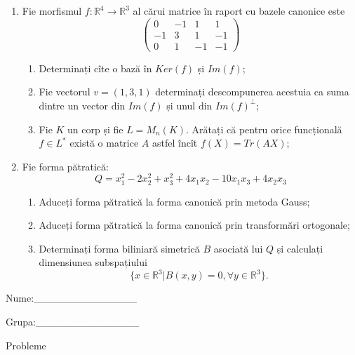 \documentclass{article}
\begin{document}
\begin{enumerate}
 \item Fie morfismul $f:\mathbb{R}^4 \to \mathbb{R}^3$ al cărui matrice în raport cu bazele canonice este
$$\begin{pmatrix}
0&-1&1&1\\
-1&3&1&-1\\
0&1&-1&-1
\end{pmatrix}$$

\begin{enumerate}
\item Determinați cîte o bază în $Ker(f)$ și $Im(f)$;
\item Fie vectorul $v=(1,3,1)$ determinați descompunerea acestuia ca suma dintre un vector din $Im(f)$ și unul din $Im(f)^\perp$;
\item Fie $K$ un corp și fie $L=M_n(K)$. Arătați că pentru orice funcțională $f \in L^*$ există o matrice $A$ astfel încît $f(X)=Tr(AX)$;
\end{enumerate}
\item Fie forma pătratică:
$$Q= x_1^2-2x_2^2+x_3^2+4x_1x_2-10x_1x_3+4x_2x_3$$

\begin{enumerate}
\item Aduceți forma pătratică la forma canonică prin metoda Gauss;
\item Aduceți forma pătratică la forma canonică prin transformări ortogonale;
\item Determinați forma biliniară simetrică $B$ asociată lui $Q$ și calculați dimensiunea subspațiului
$$\{x \in \mathbb{R}^3 | B(x,y)=0,\forall y \in \mathbb{R}^3\}.$$

\end{enumerate}
\end{enumerate}
\newpage
\begin{flushright}
Nume:\_\_\_\_\_\_\_\_\_\_\_\_\_\_
 
 
Grupa:\_\_\_\_\_\_\_\_\_\_\_\_\_\_
\end{flushright}
\begin{center}
\vspace{2cm}
{\Large Probleme}
\vspace{2cm}
\end{center}
\end{document}

